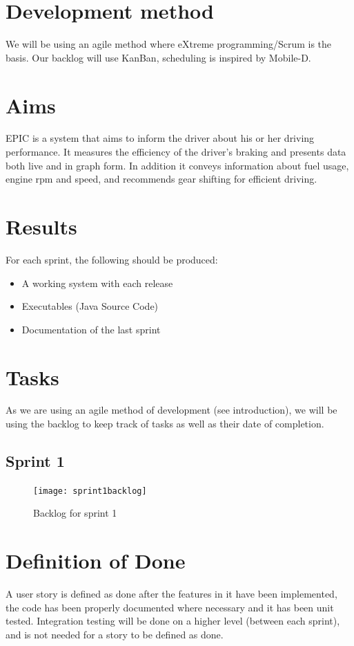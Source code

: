 \documentclass[a4paper,12pt]{article}
\begin{document}
\section{Development method}
We will be using an agile method where eXtreme programming/Scrum is the basis. Our backlog will use KanBan, scheduling is inspired by Mobile-D.

\section{Aims}
EPIC is a system that aims to inform the driver about his or her driving performance. It measures the efficiency of the driver’s braking and presents data both live and in graph form. In addition it conveys information about fuel usage, engine rpm and speed, and recommends gear shifting for efficient driving.

\section{Results}
For each sprint, the following should be produced:
\begin{itemize}
	\item A working system with each release
	\item Executables (Java Source Code)
	\item Documentation of the last sprint
\end{itemize}

\section{Tasks}
As we are using an agile method of development (see introduction), we will be using the backlog to keep track of tasks as well as their date of completion.

\subsection{Sprint 1}
\begin{figure}[h]
	\centering
	\texttt{[image: sprint1backlog]}
	\caption{Backlog for sprint 1}
\end{figure}

\section{Definition of Done}
A user story is defined as done after the features in it have been implemented,
the code has been properly documented where necessary and it has been
unit tested. Integration testing will be done on a higher level (between each
sprint), and is not needed for a story to be defined as done.
\end{document}

